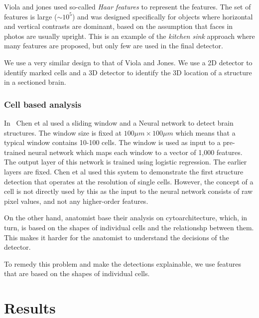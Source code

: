 \documentclass[runningheads]{llncs}
\begin{document}
Viola and jones used so-called {\em Haar features} to represent the
features. The set of features is large ($\sim 10^5$) and was designed
specifically for objects where horizontal and vertical contrasts are
dominant, based on the assumption that faces in photos are usually
upright. This is an example of the {\em kitchen sink} approach where
many features are proposed, but only few are used in the final detector.

We use a very similar design to that of Viola and Jones. We use a 2D
detector to identify marked cells and a 3D detector to identify the 3D
location of a structure in a sectioned brain.

\subsubsection{Cell based analysis}

In~\cite{chen2019active} Chen et al used a sliding window and a
Neural network to detect brain structures. The window size is fixed at
$100 \mu m \times 100 \mu m$ which means that a typical window contains 10-100 cells.
The window is used as input to a pre-trained neural network which maps
each window to a vector of 1,000 features. The output layer of
this network is trained using logistic regression. The earlier layers
are fixed. Chen et al used this system to demonstrate the first
structure detection that operates at the resolution of single cells.
However, the concept of a cell is not directly used by this as the
input to the neural network consists of raw pixel values, and not any
higher-order features.

On the other hand, anatomist base their analysis on cytoarchitecture,
which, in turn, is based on the shapes of individual cells and the
relationshp between them. This makes it harder for the anatomist to
understand the decisions of the detector.

To remedy this problem and make the detections explainable, we use
features that are based on the shapes of individual cells.

\section{Results}
\end{document}
